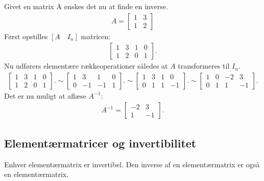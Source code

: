 \begin{eks}
Givet en matrix A ønskes det nu at finde en inverse. 
\begin{align*}
A= \begin{bmatrix}
1 & 3 \\
1 & 2
\end{bmatrix}
\end{align*}
Først opstilles $[A \quad I_n]$ matricen: 
\begin{align*}
\begin{bmatrix}
1 & 3 & 1 & 0 \\
1 & 2 & 0 & 1
\end{bmatrix}.
\end{align*}
Nu udførers elementære rækkeoperationer således at $A$ transformeres til $I_n$. 
\begin{align*}
\begin{bmatrix}
1 & 3 & 1 & 0 \\
1 & 2 & 0 & 1
\end{bmatrix}.
\sim \begin{bmatrix}
1 & 3 & 1 & 0 \\
0 & -1 & -1 & 1
\end{bmatrix}.
\sim \begin{bmatrix}
1 & 3 & 1 & 0 \\
0 & 1 & 1 & -1
\end{bmatrix}.
\sim \begin{bmatrix}
1 & 0 & -2 & 3 \\
0 & 1 & 1 & -1
\end{bmatrix}.
\end{align*}
Det er nu muligt at aflæse $A^{-1}$:
\begin{align*}
A^{-1} =\begin{bmatrix}
-2 & 3\\
1 & -1 
\end{bmatrix}.
\end{align*}
\end{eks}

\subsection{Elementærmatricer og invertibilitet}

\begin{defn}
Enhver elementærmatrix er invertibel. Den inverse af en elementærmatrix er også en elementærmatrix. 
\end{defn}

